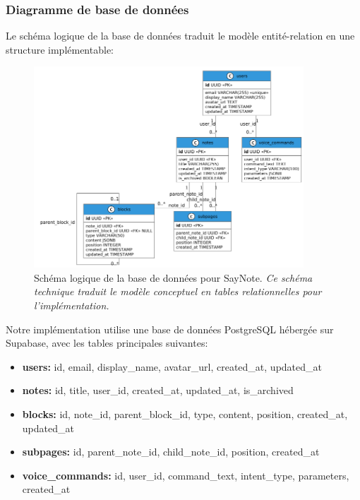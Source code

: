     \subsubsection{Diagramme de base de données}
    
    Le schéma logique de la base de données traduit le modèle entité-relation en une structure implémentable:
    
        \begin{figure}[htbp]
        \centering
        \includegraphics[width=0.9\textwidth]{assets/docs/SayNote_db_schema.png}
        \caption{Schéma logique de la base de données pour SayNote. \newline\textit{Ce schéma technique traduit le modèle conceptuel en tables relationnelles pour l'implémentation.}}
        \label{fig:db_schema}
    \end{figure}
    
    Notre implémentation utilise une base de données PostgreSQL hébergée sur Supabase, avec les tables principales suivantes:
    
    \begin{itemize}
        \item \textbf{users:} id, email, display\_name, avatar\_url, created\_at, updated\_at
        
        \item \textbf{notes:} id, title, user\_id, created\_at, updated\_at, is\_archived
        
        \item \textbf{blocks:} id, note\_id, parent\_block\_id, type, content, position, created\_at, updated\_at
        
        \item \textbf{subpages:} id, parent\_note\_id, child\_note\_id, position, created\_at
        
        \item \textbf{voice\_commands:} id, user\_id, command\_text, intent\_type, parameters, created\_at
    \end{itemize}
    
